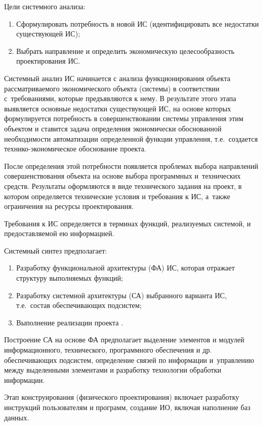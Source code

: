 \documentclass{ou}
\begin{document}
Цели системного анализа:
\begin{enumerate}[leftmargin=0em, itemindent=3.75em, nosep, label=\arabic*)]
\item Сформулировать потребность в новой ИС (идентифицировать все недостатки существующей ИС);
\item Выбрать направление и определить экономическую целесообразность проектирования ИС\cite{pis_lecture}.
\end{enumerate}

Системный анализ ИС начинается с анализа функционирования объекта рассматриваемого экономического объекта (системы) в соответствии с~требованиями, которые предъявляются к нему. В результате этого этапа выявляется основные недостатки существующей ИС, на основе которых формулируется потребность в совершенствовании системы управления этим объектом и ставится задача определения экономически обоснованной необходимости автоматизации определенной функции управления, т.е.~создается технико-экономическое обоснование проекта.

После определения этой потребности появляется проблемах выбора направлений совершенствования объекта на основе выбора программных и~технических средств. Результаты оформляются в виде технического задания на проект, в котором определяется технические условия и требования к ИС, а~также ограничения на ресурсы проектирования.

Требования к ИС определяется в терминах функций, реализуемых системой, и предоставляемой ею информацией.

Системный синтез предполагает:
\begin{enumerate}[leftmargin=0em, itemindent=3.75em, nosep, label=\arabic*)]
\item Разработку функциональной архитектуры (ФА) ИС, которая отражает структуру выполняемых функций;
\item Разработку системной архитектуры (СА) выбранного варианта ИС, т.е.~состав обеспечивающих подсистем;
\item Выполнение реализации проекта \cite{cyberleninka_lifecycle}.
\end{enumerate}
 
Построение СА на основе ФА предполагает выделение элементов и модулей информационного, технического, программного обеспечения и др. обеспечивающих подсистем, определение связей по информации и~управлению между выделенными элементами и разработку технологии обработки информации.

Этап конструирования (физического проектирования) включает разработку инструкций пользователям и программ, создание ИО, включая наполнение баз данных.
\end{document}
